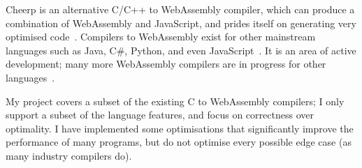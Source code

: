 \documentclass[00-main.tex]{subfiles}
\begin{document}
Cheerp is an alternative C/C++ to WebAssembly compiler, which can produce a combination of WebAssembly and JavaScript, and prides itself on generating very optimised code~.
Compilers to WebAssembly exist for other mainstream languages such as Java, C\#, Python, and even JavaScript~.
It is an area of active development; many more WebAssembly compilers are in progress for other languages~.

My project covers a subset of the existing C to WebAssembly compilers; I only support a subset of the language features, and focus on correctness over optimality.
I have implemented some optimisations that significantly improve the performance of many programs, but do not optimise every possible edge case (as many industry compilers do).
\end{document}
